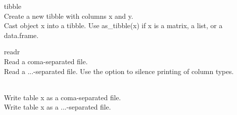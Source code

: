 
\vspace{3.5ex}

\begin{block}{tibble}
   \\ Create a new tibble with columns x and y.\br
   \\ Cast object x into a tibble.\br
  Use as\_tibble(x) if x is a matrix, a list, or a data.frame.
\end{block}

\vspace{4ex}

\begin{block}{readr}
     \\ Read a coma-separated file.\br
     \\ Read a ...-separated file.\br
    Use the option  to silence printing of column types.

    \\ Write table x as a coma-separated file.\br
     \\ Write table x as a ...-separated file.
\end{block}
